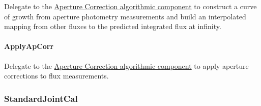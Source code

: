 Delegate to the \hyperref[sec:acApCorr]{Aperture Correction algorithmic component} to construct a curve of growth from aperture photometry measurements and build an interpolated mapping from other fluxes to the predicted integrated flux at infinity.

\paragraph{ApplyApCorr}
\label{sec:drpBootstrapImChar_ApplyApCorr}

Delegate to the \hyperref[sec:acApCorr]{Aperture Correction algorithmic component} to apply aperture corrections to flux measurements.

\let\hr\undefined

\subsubsection{StandardJointCal}
\label{sec:drpStandardJointCal}

